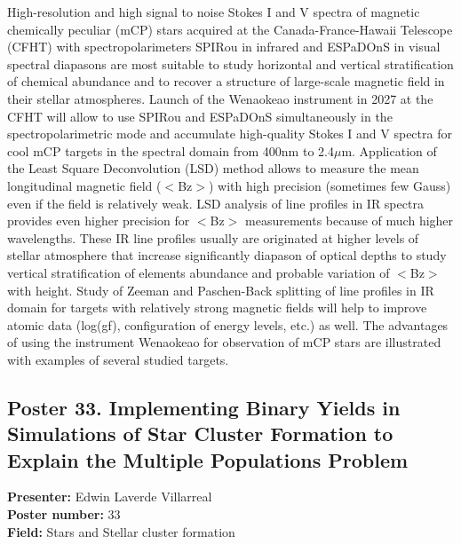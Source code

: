 High-resolution and high signal to noise Stokes I and V spectra of magnetic chemically peculiar (mCP) stars acquired at the Canada-France-Hawaii Telescope (CFHT) with spectropolarimeters SPIRou in infrared and ESPaDOnS in visual spectral diapasons are most suitable to study horizontal and vertical stratification of chemical abundance and to recover a structure of large-scale magnetic field in their stellar atmospheres. Launch of the Wenaokeao instrument in 2027 at the CFHT will allow to use SPIRou and ESPaDOnS simultaneously in the spectropolarimetric mode and accumulate high-quality Stokes I and V spectra for cool mCP targets in the spectral domain from 400nm to 2.4$\mu$m. Application of the Least Square Deconvolution (LSD) method allows to measure the mean longitudinal magnetic field ($<$Bz$>$) with high precision (sometimes few Gauss) even if the field is relatively weak. LSD analysis of line profiles in IR spectra provides even higher precision for $<$Bz$>$ measurements because of much higher wavelengths. These IR line profiles usually are originated at higher levels of stellar atmosphere that increase significantly diapason of optical depths to study vertical stratification of elements abundance and probable variation of $<$Bz$>$ with height. Study of Zeeman and Paschen-Back splitting of line profiles in IR domain for targets with relatively strong magnetic fields will help to improve atomic data (log(gf), configuration of energy levels, etc.) as well. The advantages of using the instrument Wenaokeao for observation of mCP stars are illustrated with examples of several studied targets.

\hypertarget{poster-abstract-talk-65}{}\label{poster-abstract-page-talk-65}
\subsection*{Poster 33. Implementing Binary Yields in Simulations of Star Cluster Formation to Explain the Multiple Populations Problem}
\textbf{Presenter:} Edwin Laverde Villarreal\\
\textbf{Poster number:} 33\\
\textbf{Field:} Stars and Stellar cluster formation

